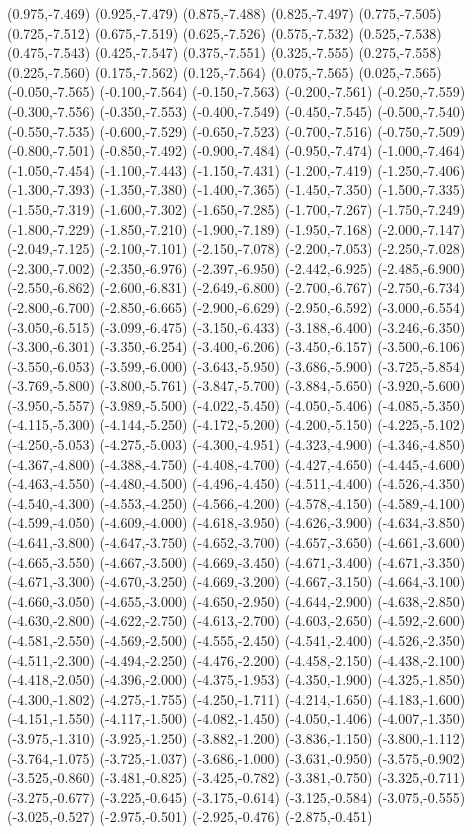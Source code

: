 (0.975,-7.469) (0.925,-7.479) (0.875,-7.488) (0.825,-7.497) (0.775,-7.505) (0.725,-7.512) (0.675,-7.519) (0.625,-7.526) (0.575,-7.532) (0.525,-7.538) (0.475,-7.543) (0.425,-7.547) (0.375,-7.551) (0.325,-7.555) (0.275,-7.558) (0.225,-7.560) (0.175,-7.562) (0.125,-7.564) (0.075,-7.565) (0.025,-7.565) (-0.050,-7.565) (-0.100,-7.564) (-0.150,-7.563) (-0.200,-7.561) (-0.250,-7.559) (-0.300,-7.556) (-0.350,-7.553) (-0.400,-7.549) (-0.450,-7.545) (-0.500,-7.540) (-0.550,-7.535) (-0.600,-7.529) (-0.650,-7.523) (-0.700,-7.516) (-0.750,-7.509) (-0.800,-7.501) (-0.850,-7.492) (-0.900,-7.484) (-0.950,-7.474) (-1.000,-7.464) (-1.050,-7.454) (-1.100,-7.443) (-1.150,-7.431) (-1.200,-7.419) (-1.250,-7.406) (-1.300,-7.393) (-1.350,-7.380) (-1.400,-7.365) (-1.450,-7.350) (-1.500,-7.335) (-1.550,-7.319) (-1.600,-7.302) (-1.650,-7.285) (-1.700,-7.267) (-1.750,-7.249) (-1.800,-7.229) (-1.850,-7.210) (-1.900,-7.189) (-1.950,-7.168) (-2.000,-7.147) (-2.049,-7.125) (-2.100,-7.101) (-2.150,-7.078) (-2.200,-7.053) (-2.250,-7.028) (-2.300,-7.002) (-2.350,-6.976) (-2.397,-6.950) (-2.442,-6.925) (-2.485,-6.900) (-2.550,-6.862) (-2.600,-6.831) (-2.649,-6.800) (-2.700,-6.767) (-2.750,-6.734) (-2.800,-6.700) (-2.850,-6.665) (-2.900,-6.629) (-2.950,-6.592) (-3.000,-6.554) (-3.050,-6.515) (-3.099,-6.475) (-3.150,-6.433) (-3.188,-6.400) (-3.246,-6.350) (-3.300,-6.301) (-3.350,-6.254) (-3.400,-6.206) (-3.450,-6.157) (-3.500,-6.106) (-3.550,-6.053) (-3.599,-6.000) (-3.643,-5.950) (-3.686,-5.900) (-3.725,-5.854) (-3.769,-5.800) (-3.800,-5.761) (-3.847,-5.700) (-3.884,-5.650) (-3.920,-5.600) (-3.950,-5.557) (-3.989,-5.500) (-4.022,-5.450) (-4.050,-5.406) (-4.085,-5.350) (-4.115,-5.300) (-4.144,-5.250) (-4.172,-5.200) (-4.200,-5.150) (-4.225,-5.102) (-4.250,-5.053) (-4.275,-5.003) (-4.300,-4.951) (-4.323,-4.900) (-4.346,-4.850) (-4.367,-4.800) (-4.388,-4.750) (-4.408,-4.700) (-4.427,-4.650) (-4.445,-4.600) (-4.463,-4.550) (-4.480,-4.500) (-4.496,-4.450) (-4.511,-4.400) (-4.526,-4.350) (-4.540,-4.300) (-4.553,-4.250) (-4.566,-4.200) (-4.578,-4.150) (-4.589,-4.100) (-4.599,-4.050) (-4.609,-4.000) (-4.618,-3.950) (-4.626,-3.900) (-4.634,-3.850) (-4.641,-3.800) (-4.647,-3.750) (-4.652,-3.700) (-4.657,-3.650) (-4.661,-3.600) (-4.665,-3.550) (-4.667,-3.500) (-4.669,-3.450) (-4.671,-3.400) (-4.671,-3.350) (-4.671,-3.300) (-4.670,-3.250) (-4.669,-3.200) (-4.667,-3.150) (-4.664,-3.100) (-4.660,-3.050) (-4.655,-3.000) (-4.650,-2.950) (-4.644,-2.900) (-4.638,-2.850) (-4.630,-2.800) (-4.622,-2.750) (-4.613,-2.700) (-4.603,-2.650) (-4.592,-2.600) (-4.581,-2.550) (-4.569,-2.500) (-4.555,-2.450) (-4.541,-2.400) (-4.526,-2.350) (-4.511,-2.300) (-4.494,-2.250) (-4.476,-2.200) (-4.458,-2.150) (-4.438,-2.100) (-4.418,-2.050) (-4.396,-2.000) (-4.375,-1.953) (-4.350,-1.900) (-4.325,-1.850) (-4.300,-1.802) (-4.275,-1.755) (-4.250,-1.711) (-4.214,-1.650) (-4.183,-1.600) (-4.151,-1.550) (-4.117,-1.500) (-4.082,-1.450) (-4.050,-1.406) (-4.007,-1.350) (-3.975,-1.310) (-3.925,-1.250) (-3.882,-1.200) (-3.836,-1.150) (-3.800,-1.112) (-3.764,-1.075) (-3.725,-1.037) (-3.686,-1.000) (-3.631,-0.950) (-3.575,-0.902) (-3.525,-0.860) (-3.481,-0.825) (-3.425,-0.782) (-3.381,-0.750) (-3.325,-0.711) (-3.275,-0.677) (-3.225,-0.645) (-3.175,-0.614) (-3.125,-0.584) (-3.075,-0.555) (-3.025,-0.527) (-2.975,-0.501) (-2.925,-0.476) (-2.875,-0.451) 